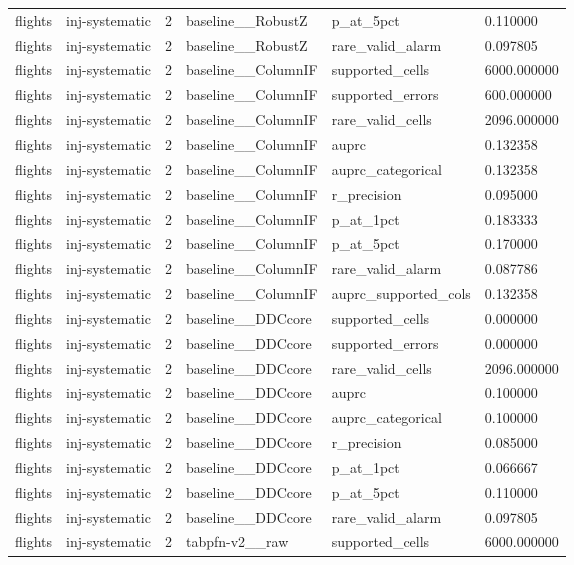 \begin{tabular}{llllll}
flights & inj-systematic & 2 & baseline\_\_RobustZ & p\_at\_5pct & 0.110000 \\
flights & inj-systematic & 2 & baseline\_\_RobustZ & rare\_valid\_alarm & 0.097805 \\
flights & inj-systematic & 2 & baseline\_\_ColumnIF & supported\_cells & 6000.000000 \\
flights & inj-systematic & 2 & baseline\_\_ColumnIF & supported\_errors & 600.000000 \\
flights & inj-systematic & 2 & baseline\_\_ColumnIF & rare\_valid\_cells & 2096.000000 \\
flights & inj-systematic & 2 & baseline\_\_ColumnIF & auprc & 0.132358 \\
flights & inj-systematic & 2 & baseline\_\_ColumnIF & auprc\_categorical & 0.132358 \\
flights & inj-systematic & 2 & baseline\_\_ColumnIF & r\_precision & 0.095000 \\
flights & inj-systematic & 2 & baseline\_\_ColumnIF & p\_at\_1pct & 0.183333 \\
flights & inj-systematic & 2 & baseline\_\_ColumnIF & p\_at\_5pct & 0.170000 \\
flights & inj-systematic & 2 & baseline\_\_ColumnIF & rare\_valid\_alarm & 0.087786 \\
flights & inj-systematic & 2 & baseline\_\_ColumnIF & auprc\_supported\_cols & 0.132358 \\
flights & inj-systematic & 2 & baseline\_\_DDCcore & supported\_cells & 0.000000 \\
flights & inj-systematic & 2 & baseline\_\_DDCcore & supported\_errors & 0.000000 \\
flights & inj-systematic & 2 & baseline\_\_DDCcore & rare\_valid\_cells & 2096.000000 \\
flights & inj-systematic & 2 & baseline\_\_DDCcore & auprc & 0.100000 \\
flights & inj-systematic & 2 & baseline\_\_DDCcore & auprc\_categorical & 0.100000 \\
flights & inj-systematic & 2 & baseline\_\_DDCcore & r\_precision & 0.085000 \\
flights & inj-systematic & 2 & baseline\_\_DDCcore & p\_at\_1pct & 0.066667 \\
flights & inj-systematic & 2 & baseline\_\_DDCcore & p\_at\_5pct & 0.110000 \\
flights & inj-systematic & 2 & baseline\_\_DDCcore & rare\_valid\_alarm & 0.097805 \\
flights & inj-systematic & 2 & tabpfn-v2\_\_raw & supported\_cells & 6000.000000 \\

\end{tabular}
